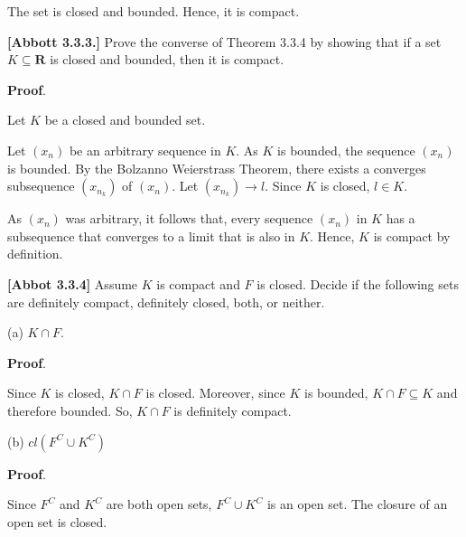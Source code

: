 \documentclass[10pt]{article}
\begin{document}
The set is closed and bounded. Hence, it is compact.



\textbf{[Abbott 3.3.3.]} Prove the converse of Theorem 3.3.4 by showing that if a set $\displaystyle K\subseteq \mathbf{R}$ is closed and bounded, then it is compact.



\textbf{Proof}.



Let $\displaystyle K$ be a closed and bounded set. 



Let $\displaystyle ( x_{n})$ be an arbitrary sequence in $\displaystyle K$. As $\displaystyle K$ is bounded, the sequence $\displaystyle ( x_{n})$ is bounded. By the Bolzanno Weierstrass Theorem, there exists a converges subsequence $\displaystyle ( x_{n_{k}})$ of $\displaystyle ( x_{n})$. Let $\displaystyle ( x_{n_{k}})\rightarrow l$. Since $\displaystyle K$ is closed, $\displaystyle l\in K$.



As $\displaystyle ( x_{n})$ was arbitrary, it follows that, every sequence $\displaystyle ( x_{n})$ in $\displaystyle K$ has a subsequence that converges to a limit that is also in $\displaystyle K$. Hence, $\displaystyle K$ is compact by definition.



\textbf{[Abbot 3.3.4]} Assume $\displaystyle K$ is compact and $\displaystyle F$ is closed. Decide if the following sets are definitely compact, definitely closed, both, or neither.



(a) $\displaystyle K\cap F$.



\textbf{Proof}. 



Since $\displaystyle K$ is closed, $\displaystyle K\cap F$ is closed. Moreover, since $\displaystyle K$ is bounded, $\displaystyle K\cap F\subseteq K$ and therefore bounded. So, $\displaystyle K\cap F$ is definitely compact.



(b) $\displaystyle cl\left( F^{C} \cup K^{C}\right)$



\textbf{Proof}.

Since $\displaystyle F^{C}$ and $\displaystyle K^{C}$ are both open sets, $\displaystyle F^{C} \cup K^{C}$ is an open set. The closure of an open set is closed.
\end{document}
